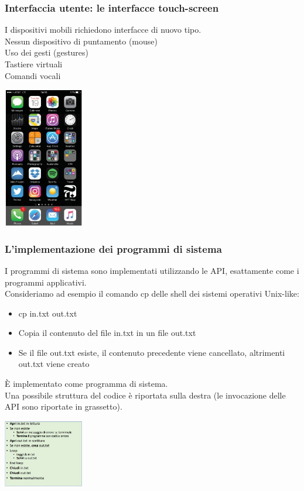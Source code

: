 \subsubsection{Interfaccia utente: le interfacce touch-screen}
I dispositivi mobili richiedono interfacce di nuovo tipo.\\
Nessun dispositivo di puntamento (mouse)\\
Uso dei gesti (gestures)\\
Tastiere virtuali\\
Comandi vocali
\begin{center}
    \includegraphics[width=35mm]{images/SO/SO_InterfacciaUtente_InterfacceTouchScreen.jpg}
\end{center}

\subsubsection{L'implementazione dei programmi di sistema}
I programmi di sistema sono implementati utilizzando le API, esattamente come i programmi applicativi.\\
Consideriamo ad esempio il comando cp delle shell dei sistemi operativi Unix-like:
\begin{itemize}
    \item cp in.txt out.txt
    \item Copia il contenuto del file in.txt in un file out.txt
    \item Se il file out.txt esiste, il contenuto precedente viene cancellato, altrimenti out.txt viene creato    
\end{itemize}
\`E implementato come programma di sistema.\\
Una possibile struttura del codice è riportata sulla destra (le invocazione delle API sono riportate in grassetto).
\begin{center}
    \includegraphics[width=35mm]{images/SO/SO_InterfacciaUtente_ProgrammiDiSistema.jpg}
\end{center}